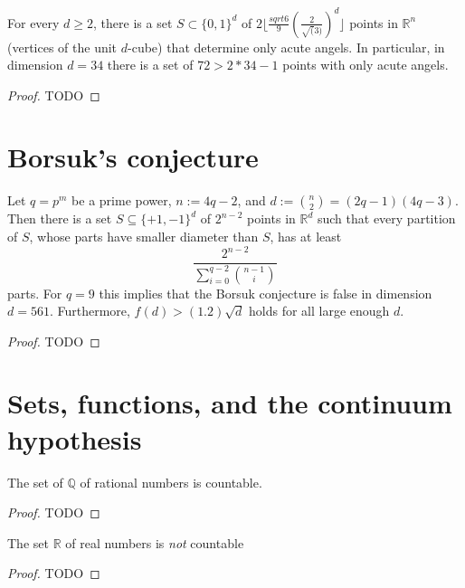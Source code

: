 \begin{theorem}
  \label{ch17theorem2}
  For every \(d\ge 2\), there is a set \(S\subset\{0, 1\}^d\) of \(2\lfloor\frac{sqrt{6}}{9}(\frac{2}{\sqrt(3)})^d\rfloor\)
  points in \(\mathbb{R}^n\) (vertices of the unit \(d\)-cube) that determine only acute angels.
  In particular, in dimension \(d = 34\) there is a set of \(72 > 2*34 - 1\) points
  with only acute angels.
\end{theorem}
\begin{proof}
  TODO
\end{proof}


\chapter{Borsuk's conjecture}

\begin{theorem}
  \label{borsuk_conjecture}
  Let $q = p^m$ be a prime power, $n := 4q - 2$, and $d := \binom{n}{2} = (2q - 1)(4q - 3)$.
  Then there is a set $S \subseteq \{+1, -1\}^d$ of $2^{n-2}$ points in $\mathbb{R}^d$
  such that every partition of $S$, whose parts have smaller diameter than $S$, has at least
  \[
  \frac{2^{n-2}}{\sum_{i=0}^{q-2} \binom{n-1}{i}}
  \]
  parts. For $q = 9$ this implies that the Borsuk conjecture is false in dimension $d = 561$.
  Furthermore, $f(d) > (1.2)\sqrt{d}$ holds for all large enough $d$.
\end{theorem}
\begin{proof}
  TODO
\end{proof}


\chapter{Sets, functions, and the continuum hypothesis}

\begin{theorem}
  \label{ch19theorem1}
  The set of \(\mathbb{Q}\) of rational numbers is countable.
\end{theorem}
\begin{proof}
  TODO
\end{proof}

\begin{theorem}
  \label{ch19theorem2}
  The set \(\mathbb{R}\) of real numbers is \emph{not} countable
\end{theorem}
\begin{proof}
  TODO
\end{proof}

